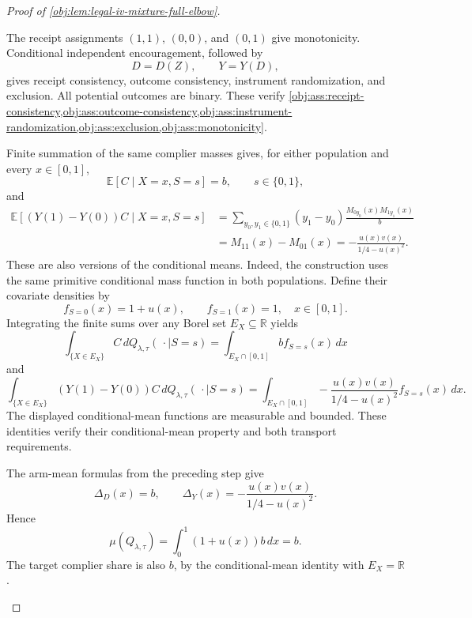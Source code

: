 \documentclass[11pt]{article}
\begin{document}
\begin{proof}[Proof of \cref{obj:lem:legal-iv-mixture-full-elbow}]
\begin{enumerate}
The receipt assignments \((1,1)\), \((0,0)\), and \((0,1)\) give monotonicity. Conditional independent encouragement, followed by
\[
D=D(Z),\qquad Y=Y(D),
\]
gives receipt consistency, outcome consistency, instrument randomization, and exclusion. All potential outcomes are binary. These verify
\cref{obj:ass:receipt-consistency,obj:ass:outcome-consistency,obj:ass:instrument-randomization,obj:ass:exclusion,obj:ass:monotonicity}.

Finite summation of the same complier masses gives, for either population and every \(x\in[0,1]\),
\[
\mathbb E[C\mid X=x,S=s]=b,
\qquad s\in\{0,1\},
\]
and
\[
\begin{aligned}
\mathbb E[(Y(1)-Y(0))C\mid X=x,S=s]
&=
\sum_{y_0,y_1\in\{0,1\}}
(y_1-y_0)\frac{M_{0y_0}(x)M_{1y_1}(x)}b\\
&=M_{11}(x)-M_{01}(x)
=-\frac{u(x)v(x)}{1/4-u(x)^2}.
\end{aligned}
\]
These are also versions of the conditional means. Indeed, the construction uses the same primitive conditional mass function in both populations. Define their covariate densities by
\[
f_{S=0}(x)=1+u(x),\qquad f_{S=1}(x)=1,
\quad x\in[0,1].
\]
Integrating the finite sums over any Borel set \(E_X\subseteq\mathbb R\) yields
\[
\int_{\{X\in E_X\}} C\,dQ_{\lambda,\tau}(\,\cdot\mid S=s)
=
\int_{E_X\cap[0,1]}b f_{S=s}(x)\,dx
\]
and
\[
\int_{\{X\in E_X\}}(Y(1)-Y(0))C\,
dQ_{\lambda,\tau}(\,\cdot\mid S=s)
=
\int_{E_X\cap[0,1]}
-\frac{u(x)v(x)}{1/4-u(x)^2}f_{S=s}(x)\,dx.
\]
The displayed conditional-mean functions are measurable and bounded. These identities verify their conditional-mean property and both transport requirements.

The arm-mean formulas from the preceding step give
\[
\Delta_D(x)=b,\qquad
\Delta_Y(x)=-\frac{u(x)v(x)}{1/4-u(x)^2}.
\]
Hence
\[
\mu(Q_{\lambda,\tau})
=
\int_0^1(1+u(x))b\,dx=b.
\]
The target complier share is also \(b\), by the conditional-mean identity with \(E_X=\mathbb R\).


\end{enumerate}
\end{proof}
\end{document}
